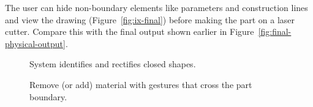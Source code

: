 \documentclass[12pt]{article}
\begin{document}
The user can hide non-boundary elements like parameters and
construction lines and view the drawing (Figure~\ref{fig:ix-final})
before making the part on a laser cutter. Compare this with the final
output shown earlier in Figure~\ref{fig:final-physical-output}.

\newpage
{}
\twocolumn

\begin{figure}[] 
\centering
{} 
\caption{System identifies and rectifies closed shapes.}
\label{fig:ix-draw-bounds}
\end{figure}

\begin{figure}[] 
\centering
{} 
\caption{Remove (or add) material with gestures that cross the part
  boundary.}
\label{fig:ix-remove-from-edge}
\end{figure}
\end{document}
